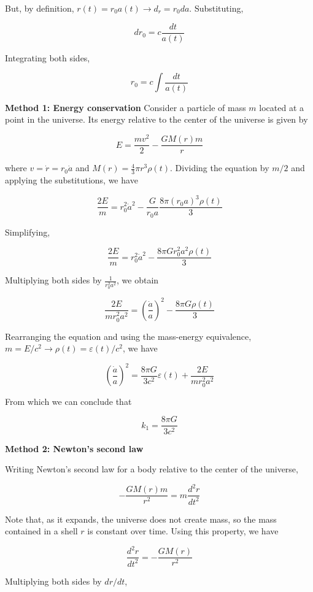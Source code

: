 \documentclass[11pt]{article}
\begin{document}
\begin{pproblem}
\begin{pssolution*}{}{ }
\begin{alternativas}
        But, by definition, \(r(t) = r_0 a(t) \rightarrow d_r = r_0 da\). Substituting,

        \[dr_0 = c\frac{dt}{a(t)}\]

        Integrating both sides,

        \[r_0 = c\int \frac{dt}{a(t)}\]

        \item \textbf{Method 1: Energy conservation}
        Consider a particle of mass \(m\) located at a point in the universe. Its energy relative to the center of the universe is given by

        \[E = \frac{mv^2}{2} - \frac{GM(r)m}{r}\]

        where \(v = \dot{r} = r_0 \dot{a}\) and \(M(r) = \frac{4}{3} \pi r^3 \rho(t)\). Dividing the equation by \(m/2\) and applying the substitutions, we have

        \[\frac{2E}{m} = r_0^2 \dot{a}^2 - \frac{G}{r_0 a} \frac{8\pi (r_0 a)^3 \rho(t)}{3}\]

        Simplifying,

        \[\frac{2E}{m} = r_0^2 \dot{a}^2 - \frac{8\pi G r_0^2 a^2 \rho(t)}{3}\]

        Multiplying both sides by \(\frac{1}{r_0^2 a^2}\), we obtain

        \[\frac{2E}{mr_0^2 a^2} = \left(\frac{\dot{a}}{a}\right)^2 - \frac{8\pi G \rho(t)}{3}\]

        Rearranging the equation and using the mass-energy equivalence, \(m = E/c^2 \rightarrow \rho(t) = \varepsilon(t)/c^2\), we have

        \[\left(\frac{\dot{a}}{a}\right)^2 = \frac{8\pi G}{3 c^2} \varepsilon(t) + \frac{2E}{mr_0^2 a^2}\]

        From which we can conclude that

        \[\boxed{k_1 = \frac{8\pi G}{3 c^2}}\]


        \textbf{Method 2: Newton's second law}

        Writing Newton's second law for a body relative to the center of the universe,

        \[-\frac{GM(r)m}{r^2} = m \frac{d^2r}{dt^2}\]

        Note that, as it expands, the universe does not create mass, so the mass contained in a shell \(r\) is constant over time. Using this property, we have

        \[\frac{d^2r}{dt^2} = -\frac{GM(r)}{r^2}\]

        Multiplying both sides by \(dr/dt\),


\end{alternativas}
\end{pssolution*}
\end{pproblem}
\end{document}
